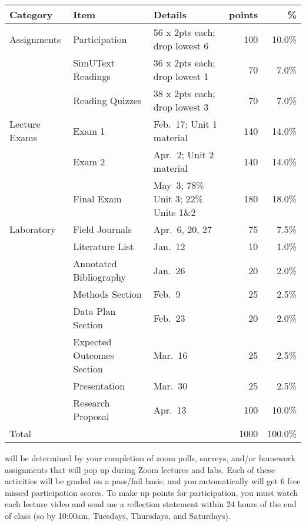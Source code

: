 \documentclass{tufte-handout}
\begin{document}

\begin{fullwidth}

\begin{table}
\begin{tabular}{l l l r r}
Category & Item & Details & points & \% \\
\hline
Assignments & Participation & 56 x 2pts each; drop lowest 6 & 100 & 10.0\% \\
& SimUText Readings   & 36 x 2pts each; drop lowest 1 & 70 & 7.0\% \\
& Reading Quizzes  & 38 x 2pts each; drop lowest 3 & 70 & 7.0\% \\
\hline
Lecture Exams & Exam 1 & Feb.~17; Unit 1 material & 140 & 14.0\% \\
& Exam 2 & Apr.~2; Unit 2 material & 140 & 14.0\% \\
& Final Exam & May~3; 78\% Unit 3; 22\% Units 1\&2 & 180 & 18.0\% \\ 		
\hline
Laboratory & Field Journals & Apr.~6, 20, 27 & 75 & 7.5\% \\
& Literature List & Jan.~12 & 10 & 1.0\% \\
& Annotated Bibliography & Jan.~26 & 20 & 2.0\% \\
& Methods Section & Feb.~9 & 25 & 2.5\% \\
& Data Plan Section & Feb.~23 & 20 & 2.0\% \\
& Expected Outcomes Section & Mar.~16 & 25 & 2.5\% \\
& Presentation & Mar.~30 & 25 & 2.5\% \\
& Research Proposal & Apr.~13 & 100 & 10.0\% \\
\hline
Total & & & 1000 & 100.0\% 
\end{tabular}
\end{table}




 will be determined by your completion of zoom polls, surveys, and/or homework assignments that will pop up during Zoom lectures and labs. Each of these activities will be graded on a pass/fail basis, and you automatically will get 6 free missed participation scores. 
\color{blue}
To make up points for participation, you must watch each lecture video and send me a reflection statement within 24 hours of the end of class (so by 10:00am, Tuesdays, Thursdays, and Saturdays).
\color{black}

\end{fullwidth}
\end{document}
